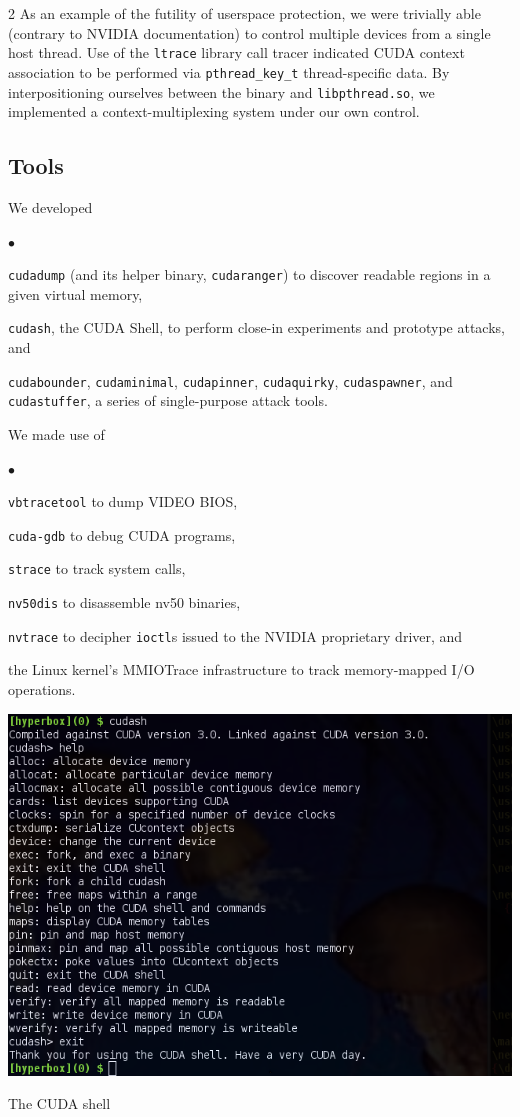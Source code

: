 \documentclass[letterpaper,10pt]{article}
\makeatletter
\newcommand{\squishlist}{\begin{list}{$\bullet$}
  {\setlength{\itemsep}{0pt}
    \setlength{\parsep}{3pt}
    \setlength{\topsep}{3pt}
    \setlength{\partopsep}{0pt}
    \setlength{\leftmargin}{1.5em}
    \setlength{\labelwidth}{1em}
    \setlength{\labelsep}{0.5em}
  } }
\newcommand{\squishend}{\end{list}}
\newenvironment{figurehere}
{\def\@captype{figure}}
{}
\makeatother
\begin{document}
\begin{multicols}{2}
As an example of the futility of userspace protection, we were trivially able
(contrary to NVIDIA documentation) to control multiple devices from a single
host thread. Use of the \texttt{ltrace} library call tracer indicated CUDA
context association to be performed via \texttt{pthread\_key\_t} thread-specific
data. By interpositioning ourselves between the binary and \texttt{libpthread.so},
we implemented a context-multiplexing system under our own control.

\subsection{Tools}
We developed
\squishlist
\item \texttt{cudadump} (and its helper binary, \texttt{cudaranger}) to
discover readable regions in a given virtual memory,
\item \texttt{cudash}, the CUDA Shell, to perform close-in experiments and
prototype attacks, and
\item \texttt{cudabounder}, \texttt{cudaminimal}, \texttt{cudapinner}, \texttt{cudaquirky},
\texttt{cudaspawner}, and \texttt{cudastuffer}, a series of single-purpose attack tools.
\squishend
We made use of
\squishlist
\item \texttt{vbtracetool}\cite{vbtrace} to dump VIDEO BIOS,
\item \texttt{cuda-gdb}\cite{cudagdb} to debug CUDA programs,
\item \texttt{strace}\cite{stracecode} to track system calls,
\item \texttt{nv50dis}\cite{nv50dis} to disassemble nv50 binaries,
\item \texttt{nvtrace}\cite{nvtrace} to decipher \texttt{ioctl}s issued to the NVIDIA proprietary driver, and
\item the Linux kernel's MMIOTrace\cite{mmiotrace} infrastructure to track memory-mapped I/O operations.
\squishend
\begin{figurehere}
\centering
\includegraphics[width=\columnwidth]{texobjs/cudash-help.png}
\caption{\small The CUDA shell}
\end{figurehere}

\end{multicols}
\end{document}
